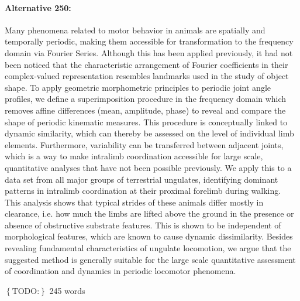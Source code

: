 \documentclass[10pt, a4paper]{article}
\newcommand{\todo}[1]{\colorbox{terracotta!30!yellow}{\footnotesize{$\left\lbrace\text{TODO:}\right\rbrace$ }#1\normalsize}}
\begin{document}
\bigskip\paragraph{Alternative 250:}
\begin{linenumbers}[1]
Many phenomena related to motor behavior in animals are spatially and temporally periodic, making them accessible for transformation to the frequency domain via Fourier Series. 
Although this has been applied previously, it had not been noticed that the characteristic arrangement of Fourier coefficients in their complex-valued representation resembles landmarks used in the study of object shape. 
To apply geometric morphometric principles to periodic joint angle profiles, we define a superimposition procedure in the frequency domain which removes affine differences (mean, amplitude, phase) to reveal and compare the shape of periodic kinematic measures. 
This procedure is conceptually linked to dynamic similarity, which can thereby be assessed on the level of individual limb elements. 
Furthermore, variability can be transferred between adjacent joints, which is a way to make intralimb coordination accessible for large scale, quantitative analyses that have not been possible previously. 
We apply this to a data set from all major groups of terrestrial ungulates, identifying dominant patterns in intralimb coordination at their proximal forelimb during walking. 
This analysis shows that typical strides of these animals differ mostly in clearance, i.e. how much the limbs are lifted above the ground in the presence or absence of obstructive substrate features. 
This is shown to be independent of morphological features, which are known to cause dynamic dissimilarity. 
Besides revealing fundamental characteristics of ungulate locomotion, we argue that the suggested method is generally suitable for the large scale quantitative assessment of coordination and dynamics in periodic locomotor phenomena. 
\end{linenumbers} \todo{245 words}

\pagebreak
\end{document}
